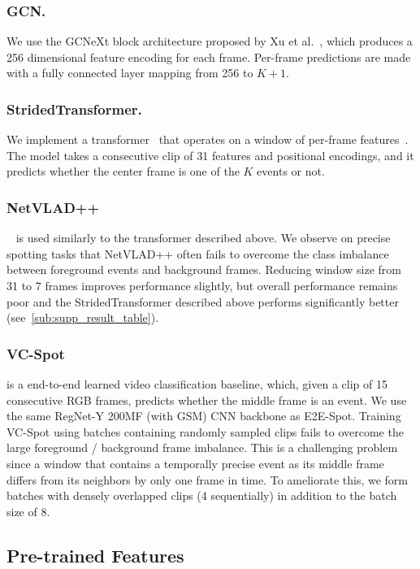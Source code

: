\documentclass[runningheads]{llncs}
\newcommand{\notation}[1]{\ensuremath{#1}\xspace}
\newcommand{\OURMETHOD}{{E2E-Spot}\xspace}
\newcommand{\NumClasses}{\notation{K}}
\begin{document}
\subsubsection*{GCN.}
We use the GCNeXt block architecture proposed by Xu et al.~\cite{gtad}, which produces a 256 dimensional feature encoding for each frame.
Per-frame predictions are made with a fully connected layer mapping from 256 to $\NumClasses + 1$.

\subsubsection*{StridedTransformer.}
We implement a transformer~\cite{pytorchtransformer} that operates on a window of per-frame features~\cite{featurecombattention}.
The model takes a consecutive clip of 31 features and positional encodings, and it predicts whether the center frame is one of the $\NumClasses$ events or not.

\subsubsection*{NetVLAD++}~\cite{netvladpp} is used similarly to the transformer described above.
We observe on precise spotting tasks that NetVLAD++ often fails to overcome the class imbalance between foreground events and background frames.
Reducing window size from 31 to 7 frames improves performance slightly, but overall performance remains poor and the StridedTransformer described above performs significantly better (see~\autoref{sub:supp_result_table}).

\subsubsection*{VC-Spot} is a end-to-end learned video classification baseline, which, given a clip of 15 consecutive RGB frames, predicts whether the middle frame is an event. We use the same RegNet-Y 200MF (with GSM) CNN backbone as \OURMETHOD.
Training VC-Spot using batches containing randomly sampled clips fails to overcome the large foreground / background frame imbalance.
This is a challenging problem since a window that contains a temporally precise event as its middle frame differs from its neighbors by only one frame in time.
To ameliorate this, we form batches with densely overlapped clips (4 sequentially) in addition to the batch size of 8.

\subsection{Pre-trained Features}
\label{sub:supp_pretrained_features}
\end{document}
